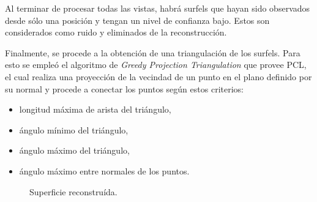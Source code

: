 	Al terminar de procesar todas las vistas, habrá surfels que hayan sido
	observados desde sólo una posición y tengan un nivel de confianza bajo.
	Estos son considerados como ruido y eliminados de la
	reconstrucción.

	Finalmente, se procede a la obtención de una triangulación de los surfels.
	Para esto se empleó el algoritmo de \emph{Greedy Projection Triangulation} que provee PCL,
	el cual realiza una proyección de la vecindad de un punto en el plano definido por su normal
	y procede a conectar los puntos según estos criterios:
	\begin{itemize}
		\item longitud máxima de arista del triángulo,
		\item ángulo mínimo del triángulo,
		\item ángulo máximo del triángulo,
		\item ángulo máximo entre normales de los puntos.
	\end{itemize}

	\begin{figure}
		\caption{\label{fig:surface}Superficie reconstruída.}
	\end{figure}
